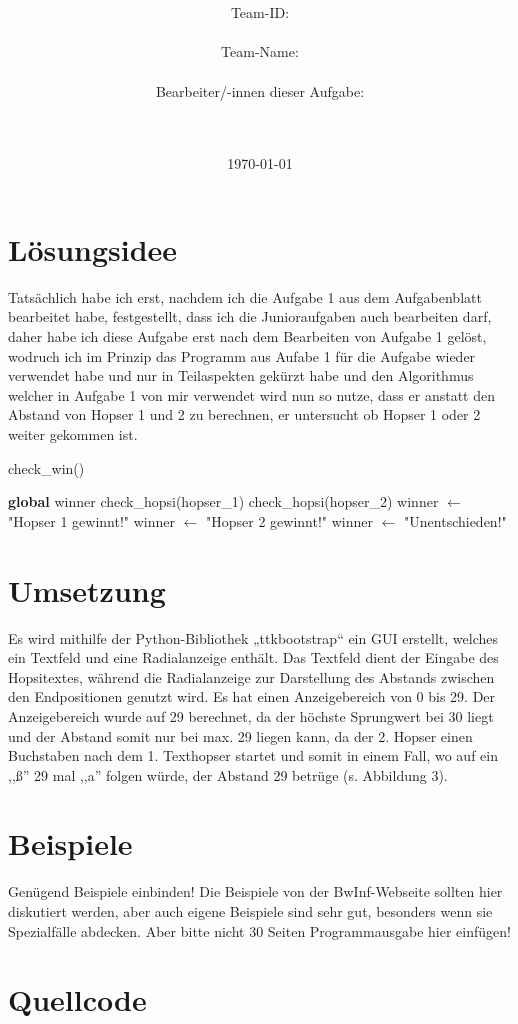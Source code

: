 \documentclass[a4paper,10pt,ngerman]{scrartcl}
\title{\textbf{\Huge\Aufgabe}}
\author{\LARGE Team-ID: \LARGE \TeamId \\\\
	\LARGE Team-Name: \LARGE \TeamName \\\\
	\LARGE Bearbeiter/-innen dieser Aufgabe: \\ 
	\LARGE \Namen\\\\}
\date{\LARGE\today}
\begin{document}
\maketitle
\tableofcontents

\vspace{0.5cm}


\section{Lösungsidee}
Tatsächlich habe ich erst, nachdem ich die Aufgabe 1 aus dem Aufgabenblatt bearbeitet habe, festgestellt, dass ich die Junioraufgaben auch bearbeiten darf, daher habe ich diese Aufgabe erst nach dem Bearbeiten von Aufgabe 1 gelöst, wodruch ich im Prinzip das Programm aus Aufabe 1 für die Aufgabe wieder verwendet habe und nur in Teilaspekten gekürzt habe und den Algorithmus welcher in Aufgabe 1 von mir verwendet wird nun so nutze, dass er anstatt den Abstand von Hopser 1 und 2 zu berechnen, er untersucht ob Hopser 1 oder 2 weiter gekommen ist.


\begin{algorithm}
\caption{check\_win()}
\begin{algorithmic}
    \State \textbf{global} winner
        \State check\_hopsi(hopser\_1)
        \State check\_hopsi(hopser\_2)
            \State winner $\gets$ "Hopser 1 gewinnt!"
            \State winner $\gets$ "Hopser 2 gewinnt!"
        \Else
            \State winner $\gets$ "Unentschieden!"
        \EndIf
    \EndWhile
\end{algorithmic}
\end{algorithm}

\section{Umsetzung}
Es wird mithilfe der Python-Bibliothek „ttkbootstrap“ ein GUI erstellt, welches ein Textfeld und 
eine Radialanzeige enthält. Das Textfeld dient der Eingabe des Hopsitextes, während die Radialanzeige
zur Darstellung des Abstands zwischen den Endpositionen genutzt wird. Es hat einen Anzeigebereich von 0 bis 
29. Der Anzeigebereich wurde auf 29 berechnet, da der höchste Sprungwert bei 30 liegt und der Abstand somit
nur bei max. 29 liegen kann, da der 2. Hopser einen Buchstaben nach dem 1. Texthopser startet und somit in einem Fall,
 wo auf ein ,,ß'' 29 mal ,,a'' folgen würde, der Abstand 29 betrüge (s. Abbildung 3).\\


\section{Beispiele}
Genügend Beispiele einbinden! Die Beispiele von der BwInf-Webseite sollten hier diskutiert werden, aber auch eigene Beispiele 
sind sehr gut, besonders wenn sie Spezialfälle abdecken. Aber bitte nicht 30 Seiten Programmausgabe hier einfügen!




\section{Quellcode}
\end{document}
